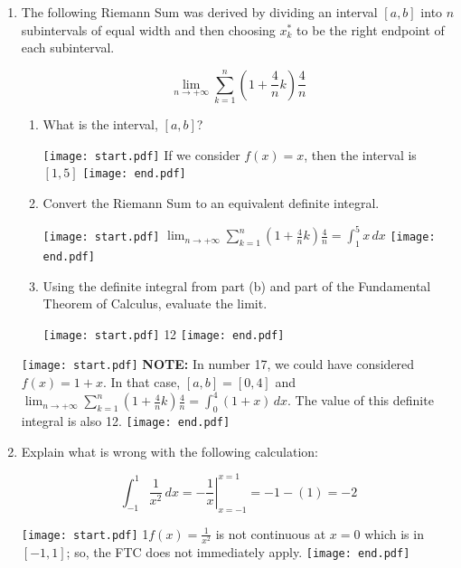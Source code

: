 \documentclass[12pt]{article}
\begin{document}
\begin{enumerate}
\item The following Riemann Sum was derived by dividing an interval $[a,b]$ into $n$ subintervals of equal width and then choosing $x_k^*$ to be the right endpoint of each subinterval.

$$\lim_{n \rightarrow +\infty} \sum_{k=1}^n{\left(1+\frac{4}{n}k\right)\frac{4}{n}}$$

\begin{enumerate}

\item What is the interval, $[a,b]$?

\texttt{[image: start.pdf]}
{{If we consider $f(x)=x$, then the interval is $[1,5]$}}
\texttt{[image: end.pdf]}


\item Convert the Riemann Sum to an equivalent definite integral.

\texttt{[image: start.pdf]}
{{$\lim_{n \rightarrow +\infty} \sum_{k=1}^n{\left(1+\frac{4}{n}k\right)\frac{4}{n}}=\int_1^5{x} \,dx$}}
\texttt{[image: end.pdf]}


\item Using the definite integral from part (b) and part of the Fundamental Theorem of Calculus, evaluate the limit.

\texttt{[image: start.pdf]}
{{12}}
\texttt{[image: end.pdf]}


\end{enumerate}

\texttt{[image: start.pdf]}
{{\bf NOTE:} In number 17, we could have considered $f(x)=1+x$.  In that case, $[a,b]=[0,4]$ and $\lim_{n \rightarrow +\infty} \sum_{k=1}^n{\left(1+\frac{4}{n}k\right)\frac{4}{n}}=\int_0^4{(1+x)} \,dx$.  The value of this definite integral is also 12.}
\texttt{[image: end.pdf]}


\item Explain what is wrong with the following calculation:

$$\int_{-1}^1 \frac{1}{x^2} \,dx =\left. -\frac{1}{x}\right|_{x=-1}^{x=1}=-1-(1)=-2$$

\texttt{[image: start.pdf]}
{{{1\linewidth}{$f(x)=\frac{1}{x^2}$ is not continuous at $x=0$ which is in $[-1,1]$; so, the FTC does not immediately apply.}}}
\texttt{[image: end.pdf]}


\end{enumerate}

\end{document}
